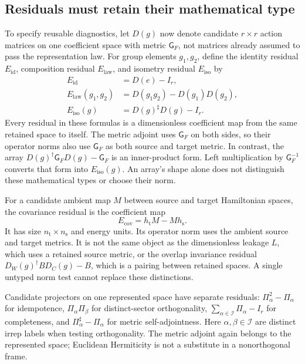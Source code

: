 \subsection{Residuals must retain their mathematical type}

To specify reusable diagnostics, let $D(g)$ now denote candidate
$r\times r$ action matrices on one coefficient space with metric
$\mathsf G_F$, not matrices already assumed to pass the representation law.
For group elements $g_1,g_2$, define the identity residual $E_{\mathrm{id}}$,
composition residual $E_{\mathrm{law}}$, and isometry residual
$E_{\mathrm{iso}}$ by
\begin{align}
  E_{\mathrm{id}}&=D(e)-I_r,
    \label{eq:symmetry-identity-residual}\\
  E_{\mathrm{law}}(g_1,g_2)
    &=D(g_1g_2)-D(g_1)D(g_2),
    \label{eq:symmetry-group-law-residual}\\
  E_{\mathrm{iso}}(g)&=D(g)^{\sharp}D(g)-I_r.
    \label{eq:symmetry-isometry-residual}
\end{align}
Every residual in these formulas is a dimensionless coefficient map from the
same retained space to itself. The metric adjoint uses $\mathsf G_F$ on both
sides, so their operator norms also use $\mathsf G_F$ as both source and
target metric. In contrast, the array
$D(g)^{\dagger}\mathsf G_FD(g)-\mathsf G_F$ is an inner-product form.
Left multiplication by $\mathsf G_F^{-1}$ converts that form into
$E_{\mathrm{iso}}(g)$. An array's shape alone does not distinguish these
mathematical types or choose their norm.

For a candidate ambient map $M$ between source and target Hamiltonian spaces,
the covariance residual is the coefficient map
\begin{equation}
  E_{\mathrm{cov}}=h_{\mathrm t}M-Mh_{\mathrm s}.
  \label{eq:symmetry-covariance-residual}
\end{equation}
It has size $n_{\mathrm t}\times n_{\mathrm s}$ and energy units.
Its operator norm uses the ambient source and target metrics. It is not the
same object as the dimensionless leakage $L$, which uses a retained source
metric, or the overlap invariance residual
$D_W(g)^{\dagger}BD_C(g)-B$, which is a pairing between retained spaces.
A single untyped norm test cannot replace these distinctions.

Candidate projectors on one represented space have separate residuals:
$\Pi_\alpha^2-\Pi_\alpha$ for idempotence,
$\Pi_\alpha\Pi_\beta$ for distinct-sector orthogonality,
$\sum_{\alpha\in\mathcal I}\Pi_\alpha-I_r$ for completeness, and
$\Pi_\alpha^{\sharp}-\Pi_\alpha$ for metric self-adjointness.
Here $\alpha,\beta\in\mathcal I$ are distinct irrep labels when testing
orthogonality. The metric adjoint again belongs to the represented space;
Euclidean Hermiticity is not a substitute in a nonorthogonal frame.

